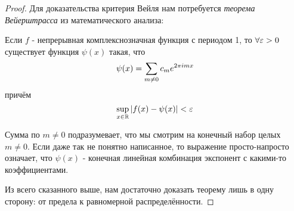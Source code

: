 \begin{proof}
	Для доказательства критерия Вейля нам потребуется \textit{теорема Вейерштрасса} из математического анализа:
	\begin{theorem}
		Если $f$ - непрерывная комплекснозначная функция с периодом 1, то $\forall \varepsilon > 0$ существует функция $\psi(x)$ такая, что
		\[
			\psi(x) = \sum\limits_{m \neq 0} c_m e^{2\pi i m x}
		\]
		причём
		\[
			\sup\limits_{x \in \mathbb{R}} |f(x) - \psi(x)| < \varepsilon
		\]
	\end{theorem}

	\begin{note}
		Сумма по $m \neq 0$ подразумевает, что мы смотрим на конечный набор целых $m \neq 0$. Если даже так не понятно написанное, то выражение просто-напросто означает, что $\psi(x)$ - конечная линейная комбинация экспонент с какими-то коэффициентами.
	\end{note}

	Из всего сказанного выше, нам достаточно доказать теорему лишь в одну сторону: от предела к равномерной распределённости.
	

\end{proof}

